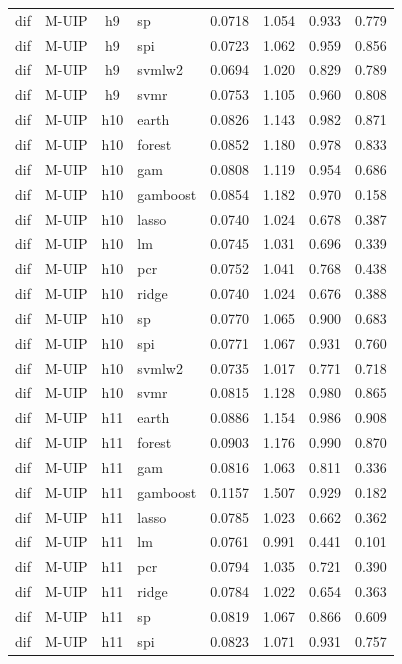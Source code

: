 \begin{ThreePartTable}
\begin{longtable}[t]{llclcccc}
dif & M-UIP & h9 & sp & 0.0718 & 1.054 & 0.933 & 0.779\\
dif & M-UIP & h9 & spi & 0.0723 & 1.062 & 0.959 & 0.856\\
dif & M-UIP & h9 & svmlw2 & 0.0694 & 1.020 & 0.829 & 0.789\\
dif & M-UIP & h9 & svmr & 0.0753 & 1.105 & 0.960 & 0.808\\
\addlinespace
dif & M-UIP & h10 & earth & 0.0826 & 1.143 & 0.982 & 0.871\\
dif & M-UIP & h10 & forest & 0.0852 & 1.180 & 0.978 & 0.833\\
dif & M-UIP & h10 & gam & 0.0808 & 1.119 & 0.954 & 0.686\\
dif & M-UIP & h10 & gamboost & 0.0854 & 1.182 & 0.970 & 0.158\\
dif & M-UIP & h10 & lasso & 0.0740 & 1.024 & 0.678 & 0.387\\
dif & M-UIP & h10 & lm & 0.0745 & 1.031 & 0.696 & 0.339\\
dif & M-UIP & h10 & pcr & 0.0752 & 1.041 & 0.768 & 0.438\\
dif & M-UIP & h10 & ridge & 0.0740 & 1.024 & 0.676 & 0.388\\
dif & M-UIP & h10 & sp & 0.0770 & 1.065 & 0.900 & 0.683\\
dif & M-UIP & h10 & spi & 0.0771 & 1.067 & 0.931 & 0.760\\
dif & M-UIP & h10 & svmlw2 & 0.0735 & 1.017 & 0.771 & 0.718\\
dif & M-UIP & h10 & svmr & 0.0815 & 1.128 & 0.980 & 0.865\\
\addlinespace
dif & M-UIP & h11 & earth & 0.0886 & 1.154 & 0.986 & 0.908\\
dif & M-UIP & h11 & forest & 0.0903 & 1.176 & 0.990 & 0.870\\
dif & M-UIP & h11 & gam & 0.0816 & 1.063 & 0.811 & 0.336\\
dif & M-UIP & h11 & gamboost & 0.1157 & 1.507 & 0.929 & 0.182\\
dif & M-UIP & h11 & lasso & 0.0785 & 1.023 & 0.662 & 0.362\\
dif & M-UIP & h11 & lm & 0.0761 & 0.991 & 0.441 & 0.101\\
dif & M-UIP & h11 & pcr & 0.0794 & 1.035 & 0.721 & 0.390\\
dif & M-UIP & h11 & ridge & 0.0784 & 1.022 & 0.654 & 0.363\\
dif & M-UIP & h11 & sp & 0.0819 & 1.067 & 0.866 & 0.609\\
dif & M-UIP & h11 & spi & 0.0823 & 1.071 & 0.931 & 0.757\\

\end{longtable}
\end{ThreePartTable}
